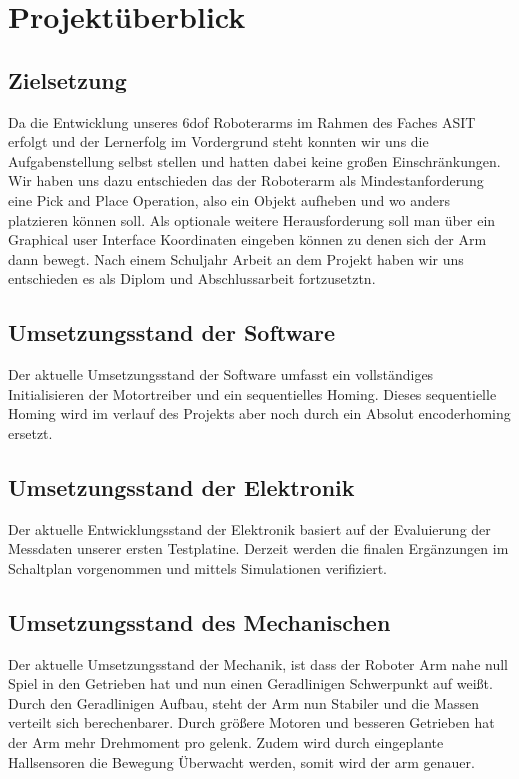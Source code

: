 \chapter{Projektüberblick}
\section{Zielsetzung}
	Da die Entwicklung unseres 6dof Roboterarms im Rahmen des Faches ASIT erfolgt und der Lernerfolg im Vordergrund steht konnten wir uns die Aufgabenstellung selbst stellen und hatten dabei keine großen Einschränkungen.  Wir haben uns dazu entschieden das der Roboterarm als Mindestanforderung eine Pick and Place Operation, also ein Objekt aufheben und wo anders platzieren können soll. Als optionale weitere Herausforderung soll man über ein Graphical user Interface Koordinaten eingeben können zu denen sich der Arm dann bewegt. Nach einem Schuljahr Arbeit an dem Projekt haben wir uns entschieden es als Diplom und Abschlussarbeit fortzusetztn.

\section{Umsetzungsstand der Software}
\label{sec:umsetzungsstand}
Der aktuelle Umsetzungsstand der Software umfasst ein vollständiges Initialisieren der Motortreiber und ein sequentielles Homing. Dieses sequentielle Homing wird im verlauf des Projekts aber noch durch ein Absolut encoderhoming ersetzt.

\section{Umsetzungsstand der Elektronik}
\label{sec:umsetzungsstand_e}
Der aktuelle Entwicklungsstand der Elektronik basiert auf der Evaluierung der Messdaten unserer ersten Testplatine. Derzeit werden die finalen Ergänzungen im Schaltplan vorgenommen und mittels Simulationen verifiziert.

\section{Umsetzungsstand des Mechanischen}
\label{sec:umsetzungsstand_m}
Der aktuelle Umsetzungsstand der Mechanik, ist dass der Roboter Arm nahe null Spiel in den Getrieben hat und nun einen Geradlinigen Schwerpunkt auf weißt.  Durch den Geradlinigen Aufbau, steht der Arm nun Stabiler und die Massen verteilt sich berechenbarer. Durch größere Motoren und besseren Getrieben hat der Arm mehr Drehmoment pro gelenk. Zudem wird durch eingeplante Hallsensoren die Bewegung Überwacht werden, somit wird der arm genauer.
